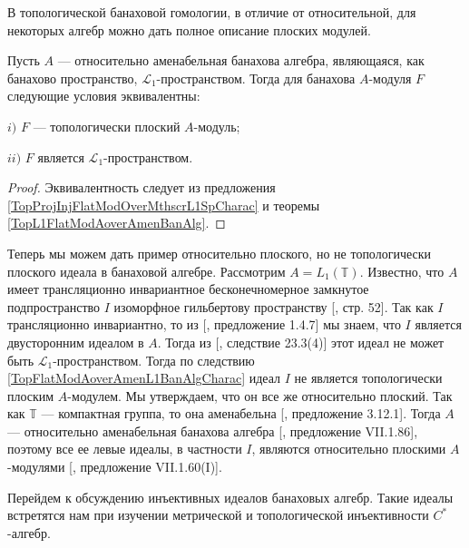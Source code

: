 В топологической банаховой гомологии, в отличие от относительной, для некоторых алгебр можно дать полное описание плоских модулей.

\begin{corollary}\label{TopFlatModAoverAmenL1BanAlgCharac} Пусть $A$ --- относительно аменабельная банахова алгебра, являющаяся, как банахово пространство, $\mathscr{L}_1$-пространством. Тогда для банахова $A$-модуля $F$ следующие условия эквивалентны:

$i)$ $F$ --- топологически плоский $A$-модуль; 

$ii)$ $F$ является $\mathscr{L}_1$-пространством.
\end{corollary}
\begin{proof} Эквивалентность следует из предложения \ref{TopProjInjFlatModOverMthscrL1SpCharac} и теоремы \ref{TopL1FlatModAoverAmenBanAlg}.
\end{proof}

Теперь мы можем дать пример относительно плоского, но не топологически плоского идеала в банаховой алгебре. Рассмотрим $A=L_1(\mathbb{T})$. Известно, что $A$ имеет трансляционно инвариантное бесконечномерное замкнутое подпространство $I$ изоморфное гильбертову пространству [\cite{RosProjTransInvSbspLpG}, стр. 52]. Так как $I$ трансляционно инвариантно, то из [\cite{KaniBanAlg}, предложение 1.4.7] мы знаем, что $I$ является двусторонним идеалом в $A$. Тогда из [\cite{DefFloTensNorOpId}, следствие 23.3(4)] этот идеал не может быть $\mathscr{L}_1$-пространством. Тогда по следствию \ref{TopFlatModAoverAmenL1BanAlgCharac} идеал $I$ не является топологически плоским $A$-модулем. Мы утверждаем, что он все же относительно плоский. Так как $\mathbb{T}$ --- компактная группа, то она аменабельна [\cite{PierAmenLCA}, предложение 3.12.1]. Тогда $A$ --- относительно аменабельная банахова алгебра [\cite{HelBanLocConvAlg}, предложение VII.1.86], поэтому все ее левые идеалы, в частности $I$, являются относительно плоскими $A$-модулями [\cite{HelBanLocConvAlg}, предложение VII.1.60(I)].

Перейдем к обсуждению инъективных идеалов банаховых алгебр. Такие идеалы встретятся нам при изучении метрической и топологической инъективности $C^*$-алгебр.

